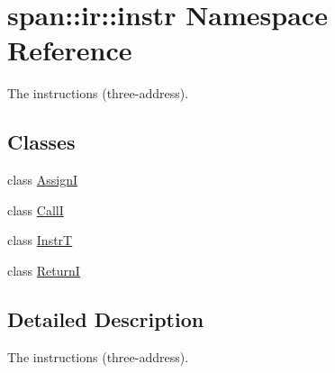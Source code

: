 \hypertarget{namespacespan_1_1ir_1_1instr}{}\section{span\+:\+:ir\+:\+:instr Namespace Reference}
\label{namespacespan_1_1ir_1_1instr}


The instructions (three-\/address).  


\subsection*{Classes}
\begin{DoxyCompactItemize}
\item 
class \hyperlink{classspan_1_1ir_1_1instr_1_1AssignI}{AssignI}
\item 
class \hyperlink{classspan_1_1ir_1_1instr_1_1CallI}{CallI}
\item 
class \hyperlink{classspan_1_1ir_1_1instr_1_1InstrT}{InstrT}
\item 
class \hyperlink{classspan_1_1ir_1_1instr_1_1ReturnI}{ReturnI}
\end{DoxyCompactItemize}


\subsection{Detailed Description}
The instructions (three-\/address). 